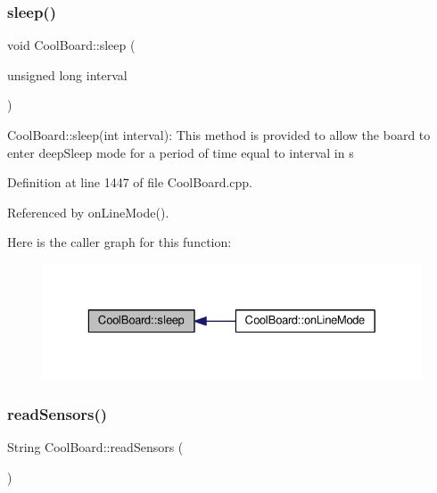 \mbox{\label{class_cool_board_a069952cdcb2e7f68518aa429eceadb6e}} 
\subsubsection{\texorpdfstring{sleep()}{sleep()}}
{\footnotesize\ttfamily void Cool\+Board\+::sleep (\begin{DoxyParamCaption}\item[{unsigned long}]{interval }\end{DoxyParamCaption})}

Cool\+Board\+::sleep(int interval)\+: This method is provided to allow the board to enter deep\+Sleep mode for a period of time equal to interval in s 

Definition at line 1447 of file Cool\+Board.\+cpp.



Referenced by on\+Line\+Mode().

Here is the caller graph for this function\+:
\nopagebreak
\begin{figure}[H]
\begin{center}
\leavevmode
\includegraphics[width=329pt]{d7/df9/class_cool_board_a069952cdcb2e7f68518aa429eceadb6e_icgraph}
\end{center}
\end{figure}
\mbox{\label{class_cool_board_ad03abdce2e65f520bbf2cff0f2d083cf}} 
\subsubsection{\texorpdfstring{read\+Sensors()}{readSensors()}}
{\footnotesize\ttfamily String Cool\+Board\+::read\+Sensors (\begin{DoxyParamCaption}{ }\end{DoxyParamCaption})}

